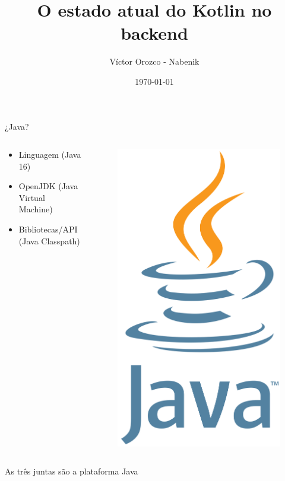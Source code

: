 \documentclass[aspectratio=169]{beamer}
\title{O estado atual do Kotlin no backend}
\author{Víctor Orozco - Nabenik}
\institute{@tuxtor}
\date{\today}
\begin{document}
{
    \frame{\titlepage}
}

\begin{frame}[fragile]{¿Java?}
\begin{columns}
    \begin{column}{0.5\textwidth}
        \begin{itemize}
            \item Linguagem (Java 16)
            \item OpenJDK (Java Virtual Machine)
            \item Bibliotecas/API (Java Classpath)
        \end{itemize}
    \end{column}
    \begin{column}{0.5\textwidth}  %
        \begin{figure}
            \centering
            \includegraphics[width=0.4\linewidth]{Images/java}
        \end{figure}
    \end{column}
\end{columns}

As três juntas são a plataforma Java
\end{frame}
\end{document}
